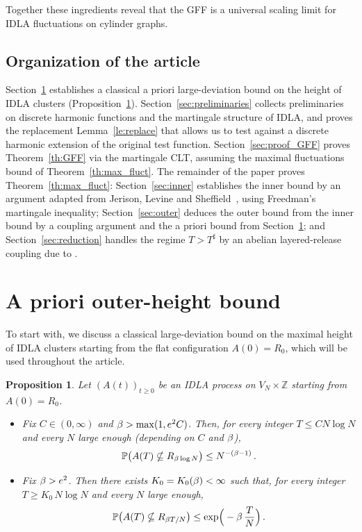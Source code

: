 \documentclass[11pt,a4paper,reqno]{amsart}
\newtheorem{Proposition}[Theorem]{Proposition}
\theoremstyle{definition}
\newcommand{\bbP}{{\ensuremath{\mathbb P}} }
\newcommand{\bbZ}{{\ensuremath{\mathbb Z}} }
\begin{document}
Together these ingredients reveal that the GFF is a universal scaling limit for IDLA fluctuations on cylinder graphs. 



\subsection{Organization of the article}
Section~\ref{sec:apriori} establishes a classical a priori large-deviation bound on the height of IDLA clusters (Proposition~\ref{pr:apriori}). Section~\ref{sec:preliminaries} collects preliminaries on discrete harmonic functions and the martingale structure of IDLA, and proves the replacement Lemma~\ref{le:replace} that allows us to test against a discrete harmonic extension of the original test function. Section~\ref{sec:proof_GFF} proves Theorem~\ref{th:GFF} via the martingale CLT, assuming the maximal fluctuations bound of Theorem~\ref{th:max_fluct}. The remainder of the paper proves Theorem~\ref{th:max_fluct}: Section~\ref{sec:inner} establishes the inner bound by an argument adapted from Jerison, Levine and Sheffield~\cite{jerison2012logarithmic}, using Freedman's martingale inequality; Section~\ref{sec:outer} deduces the outer bound from the inner bound by a coupling argument and the a priori bound from Section~\ref{sec:apriori}; and Section~\ref{sec:reduction} handles the regime $T > T^\sharp$ by an abelian layered-release coupling due to \cite{silvestri2020internal}.

\medskip 

 \section{A priori outer-height bound}\label{sec:apriori}
To start with, we discuss a classical large-deviation bound on the maximal height of IDLA clusters starting from the flat configuration $A(0) = R_0$, which will be used throughout the article. 

\begin{Proposition}\label{pr:apriori}
Let $(A(t))_{t \geq 0}$ be an IDLA process on $V_N \times \bbZ$ starting from $A(0) = R_0$.
\begin{itemize}
\item[(a)] Fix $C \in (0, \infty)$ and $\beta > \max(1, e^2 C)$. Then, for every integer $T \leq C N \log N$ and every $N$ large enough (depending on $C$ and $\beta$),
	\[ \bbP \big( A(T) \nsubseteq R_{\b \log N} \big) \leq N^{-(\b - 1)}\,. \]
\item[(b)] Fix $\beta > e^2$. Then there exists $K_0 = K_0(\beta) < \infty$ such that, for every integer $T \geq K_0\, N\log N$ and every $N$ large enough,
	\[ \bbP \big( A(T) \nsubseteq R_{\b T/N} \big) \leq \exp\!\Big( -\b\, \frac{T}{N}\Big)\,. \]
\end{itemize}
\end{Proposition}
\end{document}
